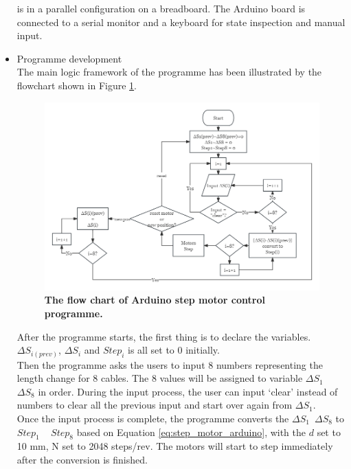 \begin{itemize}
    is in a parallel configuration on a breadboard. The Arduino board is connected to a serial monitor and a 
    keyboard for state inspection and manual input.
    \item Programme development \\
    The main logic framework of the programme has been illustrated by the flowchart shown in Figure \ref{fig:motor_flowchart}.
    \begin{figure}[H] %
        \centering 
        \captionsetup{labelsep=colon}
        \includegraphics[width=1.0\textwidth]{Image/Design/flowchart_arduino_motor.png} 
        \caption[The flow chart of Arduino step motor control programme]
        {\centering \textbf{The flow chart of Arduino step motor control programme.}}
        \label{fig:motor_flowchart}
    \end{figure}
    After the programme starts, the first thing is to declare the variables. $\Delta S_{i(prev)}$, $\Delta S_i$ and 
    $Step_i$ is all set to 0 initially. \\ Then the programme asks the users to input 8 numbers representing the 
    length change for 8 cables. The 8 values will be assigned to variable $\Delta S_1$ ~ $\Delta S_8$ in order. 
    During the input process, the user can input `clear' instead of numbers to clear all the previous input and 
    start over again from $\Delta S_1$. \\
    Once the input process is complete, the programme converts the $\Delta S_1$~$\Delta S_8$ to $Step_1$ ~ $Step_8$ 
    based on Equation \ref{eq:step_motor_arduino}, with the $d$ set to 10 mm, N set to 2048 steps/rev. The motors 
    will start to step immediately after the conversion is finished. \\

\end{itemize}
